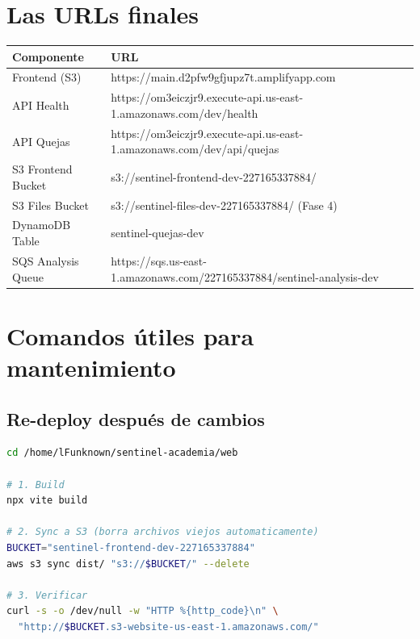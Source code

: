 \documentclass[11pt,a4paper,oneside]{article}
\begin{document}
\section{Las URLs finales}

\begin{tcolorbox}[colback=okgreen!5!white,colframe=okgreen,title={\textbf{URLs del proyecto en producci\'on}}]
\begin{tabular}{ll}
\toprule
\textbf{Componente} & \textbf{URL} \\
\midrule
Frontend (S3) & https://main.d2pfw9gfjupz7t.amplifyapp.com \\
API Health & https://om3eiczjr9.execute-api.us-east-1.amazonaws.com/dev/health \\
API Quejas & https://om3eiczjr9.execute-api.us-east-1.amazonaws.com/dev/api/quejas \\
S3 Frontend Bucket & s3://sentinel-frontend-dev-227165337884/ \\
S3 Files Bucket & s3://sentinel-files-dev-227165337884/ (Fase 4) \\
DynamoDB Table & sentinel-quejas-dev \\
SQS Analysis Queue & https://sqs.us-east-1.amazonaws.com/227165337884/sentinel-analysis-dev \\
\bottomrule
\end{tabular}
\end{tcolorbox}

\section{Comandos \'utiles para mantenimiento}

\subsection{Re-deploy despu\'es de cambios}

\begin{lstlisting}[language=bash,caption={Re-deploy completo}]
cd /home/lFunknown/sentinel-academia/web

# 1. Build
npx vite build

# 2. Sync a S3 (borra archivos viejos automaticamente)
BUCKET="sentinel-frontend-dev-227165337884"
aws s3 sync dist/ "s3://$BUCKET/" --delete

# 3. Verificar
curl -s -o /dev/null -w "HTTP %{http_code}\n" \
  "http://$BUCKET.s3-website-us-east-1.amazonaws.com/"
\end{lstlisting}
\end{document}
